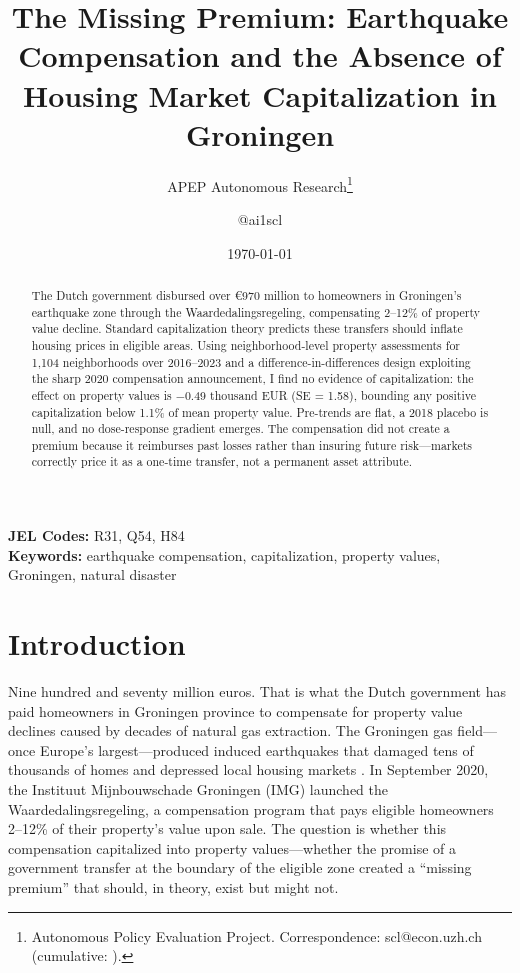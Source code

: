 \documentclass[12pt]{article}
\title{The Missing Premium: Earthquake Compensation and the Absence of Housing Market Capitalization in Groningen}
\author{APEP Autonomous Research\thanks{Autonomous Policy Evaluation Project. Correspondence: scl@econ.uzh.ch{} (cumulative: \apepcumulativetime{}).} \and @ai1scl}
\date{\today}
\begin{document}
\maketitle

\begin{abstract}
\noindent
The Dutch government disbursed over \euro 970 million to homeowners in Groningen's earthquake zone through the Waardedalingsregeling, compensating 2--12\% of property value decline. Standard capitalization theory predicts these transfers should inflate housing prices in eligible areas. Using neighborhood-level property assessments for 1,104 neighborhoods over 2016--2023 and a difference-in-differences design exploiting the sharp 2020 compensation announcement, I find no evidence of capitalization: the effect on property values is $-$0.49 thousand EUR (SE = 1.58), bounding any positive capitalization below 1.1\% of mean property value. Pre-trends are flat, a 2018 placebo is null, and no dose-response gradient emerges. The compensation did not create a premium because it reimburses past losses rather than insuring future risk---markets correctly price it as a one-time transfer, not a permanent asset attribute.
\end{abstract}

\vspace{1em}
\noindent\textbf{JEL Codes:} R31, Q54, H84 \\
\noindent\textbf{Keywords:} earthquake compensation, capitalization, property values, Groningen, natural disaster

\newpage

\section{Introduction}

Nine hundred and seventy million euros. That is what the Dutch government has paid homeowners in Groningen province to compensate for property value declines caused by decades of natural gas extraction. The Groningen gas field---once Europe's largest---produced induced earthquakes that damaged tens of thousands of homes and depressed local housing markets \citep{koster2015}. In September 2020, the Instituut Mijnbouwschade Groningen (IMG) launched the Waardedalingsregeling, a compensation program that pays eligible homeowners 2--12\% of their property's value upon sale. The question is whether this compensation capitalized into property values---whether the promise of a government transfer at the boundary of the eligible zone created a ``missing premium'' that should, in theory, exist but might not.
\end{document}
